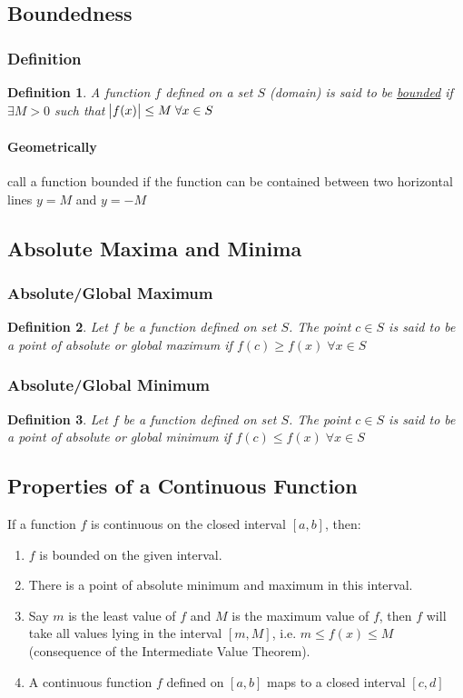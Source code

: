 \documentclass[14]{article}
\newtheorem{define}{Definition}
\theoremstyle{definition}
\theoremstyle{case}
\begin{document}
\subsection{Boundedness}
\subsubsection{Definition}
\begin{define}
A function $f$ defined on a set $S$ (domain) is said to be \underline{bounded} if $\exists M > 0$ such that $\abs{f(x)} \leq M \; \forall x \in S$
\end{define}
\paragraph{Geometrically} call a function bounded if the function can be contained between two horizontal lines $y = M$ and $y = -M$
\pagebreak
\subsection{Absolute Maxima and Minima}
\subsubsection{Absolute/Global Maximum}
\begin{define}
Let $f$ be a function defined on set $S$. The point $c \in S$ is said to be a point of absolute or global maximum if $f(c) \geq f(x) \; \forall x \in S$
\end{define}
\subsubsection{Absolute/Global Minimum}
\begin{define}
Let $f$ be a function defined on set $S$. The point $c \in S$ is said to be a point of absolute or global minimum if $f(c) \leq f(x) \; \forall x \in S$
\end{define}
\subsection{Properties of a Continuous Function}
If a function $f$ is continuous on the closed interval $[a, b]$, then:
\begin{enumerate}
\item $f$ is bounded on the given interval.
\item There is a point of absolute minimum and maximum in this interval.
\item Say $m$ is the least value of $f$ and $M$ is the maximum value of $f$, then $f$ will take all values lying in the interval $[m, M]$, i.e. $m \leq f(x) \leq M$ (consequence of the Intermediate Value Theorem).
\item A continuous function $f$ defined on $[a, b]$ maps to a closed interval $[c, d]$
\end{enumerate}
\end{document}
